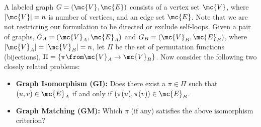 \documentclass[10pt,journal,cspaper,compsoc]{IEEEtran}
\newcommand{\PmcP}{P \in \mc{P}}
\begin{document}
A labeled graph $G=(\mc{V},\mc{E})$ consists of a vertex set $\mc{V}$, where $|\mc{V}|=n$ is number of vertices, and an edge set $\mc{E}$. %
Note that we are not restricting our formulation to be directed or exclude self-loops. Given a pair of graphs, $G_A=(\mc{V}_A,\mc{E}_A)$ and $G_B=(\mc{V}_B,\mc{E}_B)$, where $|\mc{V}_A|=|\mc{V}_B|=n$, 
let $\Pi$ be the set of permutation functions (bijections), $\Pi=\{\pi \from \mc{V}_A \to \mc{V}_B\}$.
Now consider the following two closely related problems:
\begin{itemize}
	\item \textbf{Graph Isomorphism (GI):}  Does there exist a $\pi \in \Pi$ such that $(u,v) \in \mc{E}_A$ if and only if $(\pi(u),\pi(v)) \in \mc{E}_B$. 
		\item \textbf{Graph Matching (GM):} Which $\pi$ (if any) satisfies the above isomorphism criterion?
\end{itemize}

\end{document}
